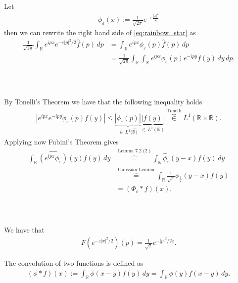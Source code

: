 \documentclass{beamer}
\numberwithin{equation}{section}
\begin{document}
\begin{frame}\frametitle{{\normalsize \secname} \\ {\large \subsecname}}
    Let 
    \begin{align}
        \phi_\varepsilon(x) := \frac{1}{\sqrt{2 \pi}} e^{-\varepsilon \frac{|x|^2}{2}}
    \end{align}
    then we can rewrite the right hand side of \eqref{eq:rainbow_star} as
    \begin{align}
        \frac{1}{\sqrt{2 \pi}} \int_\mathbb{R} e^{ipx}e^{- \varepsilon |p|^2/2} \hat{f}(p) \, dp &= \int_\mathbb{R} e^{ipx} \phi_\varepsilon(p) \hat{f}(p) \, dp \\
        &= \frac{1}{\sqrt{2 \pi}} \int_\mathbb{R} \int_\mathbb{R} e^{ipx}  \phi_\varepsilon(p) e^{-ipy} f(y) \, dy \, dp.
    \end{align}
\end{frame}

\begin{frame}\frametitle{{\normalsize \secname} \\ {\large \subsecname}}
    By Tonelli's Theorem we have that the following inequality holds
    \begin{align}
        | e^{ipx}e^{-ipy} \phi_\varepsilon(p) f(y) | \leq \underbrace{|\phi_\varepsilon(p) |}_{\in \, L^1(\hat{\mathbb{R})}} \underbrace{| f(y) |}_{\in \, L^1(\mathbb{R})} \overbrace{\in}^{\text{Tonelli}} L^1( \mathbb{R} \times \mathbb{R}).
    \end{align}
    Applying now Fubini's Theorem gives
    \begin{align}
        \int_\mathbb{R} \widehat{\left( e^{ipx} \phi_\varepsilon  \right)}(y) f(y) \, dy &\overbrace{=}^{\text{Lemma 7.2 (2.)}} \int_\mathbb{R} \hat{\phi}_\varepsilon(y-x) f(y) \, dy \\
        &\overbrace{=}^{\text{Gaussian Lemma}} \int_\mathbb{R} \frac{1}{\sqrt{\varepsilon}} \phi_{\frac{1}{\varepsilon}}(y - x) f(y) \\ 
        &= (\Phi_\varepsilon * f)(x),
    \end{align}
\end{frame}

\begin{frame}\frametitle{{\normalsize \secname} \\ {\large \subsecname}}
    \begin{lemma}
        We have that
        \begin{align}
            F\left(e^{-z|x|^2/2}\right)(p) = \frac{1}{\sqrt{z}}e^{-|p|^2/2z}.
        \end{align}
    \end{lemma}
    \begin{definition}[Convolution]
        The convolution of two functions is defined as
        \begin{align}
            (\phi * f)(x) := \int_\mathbb{R} \phi(x - y) f(y) \, dy = \int_\mathbb{R} \phi(y) f(x - y) \, dy. 
        \end{align}
    \end{definition}
\end{frame}
\end{document}

